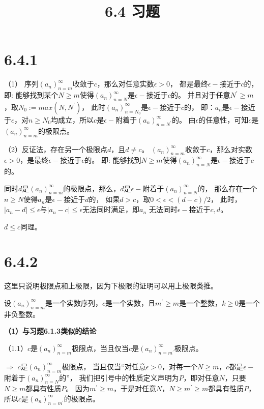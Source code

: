 \documentclass{article}
\theoremstyle{mystyle}
\begin{document}
\title{6.4 习题}
\maketitle

\section*{6.4.1}

（1）
序列$(a_n)_{n=m}^\infty$收敛于$c$，那么对任意实数$\epsilon > 0$，
都是最终$\epsilon -$接近于$c$的，
即: 能够找到某个$N \geq m$使得$(a_n)_{n=N}^\infty$是$\epsilon-$接近于$c$的。
并且对于任意$N^\prime \geq m$，取$N_0 := max(N, N^\prime)$，
此时$(a_n)_{n=N_0}^\infty$是$\epsilon-$接近于$c$的，
即：$a_n$是$\epsilon-$接近于$c$，对$n \geq N_0$均成立，所以$c$是$\epsilon-$附着于$(a_n)_{n=N^\prime}^\infty$的。
由$\epsilon$的任意性，可知$c$是$(a_n)_{n=m}^\infty$的极限点。

（2）反证法，存在另一个极限点$d$，且$d \neq c$。
$(a_n)_{n=m}^\infty$收敛于$c$，那么对实数$\epsilon > 0$，是最终$\epsilon -$接近于$c$的。
即: 能够找到$N \geq m$使得$(a_n)_{n=N}^\infty$是$\epsilon-$接近于$c$的。

同时$d$是$(a_n)_{n=m}^\infty$的极限点，那么，$d$是$\epsilon-$附着于$(a_n)_{n=N}^\infty$的，
那么存在一个$n \geq N$使得$a_n$是$\epsilon-$接近于$d$的，
如果$d > c$，取$0 <\epsilon < (d-c)/2$，
此时，$|a_n - d| \leq \epsilon$与$|a_n - c| \leq \epsilon$无法同时满足，即$a_n$
无法同时$\epsilon-$接近于$c,d$。

$d \leq c$同理。

\section*{6.4.2}

这里只说明极限点和上极限，因为下极限的证明可以用上极限类推。

设$(a_n)_{n=m}^\infty$是一个实数序列，$c$是一个实数，且$m^\prime \geq m$是一个整数，$k \geq 0$是一个非负整数。

\textbf{（1）与习题6.1.3类似的结论}

（1.1）$c$是$(a_n)_{n=m}^\infty$极限点，当且仅当$c$是$(a_n)_{n=m^\prime}^\infty$极限点。

\textbf{$\Rightarrow$} $c$是$(a_n)_{n=m}^\infty$极限点，
当且仅当“对任意$\epsilon > 0$，对每一个$N \geq m$，$c$都是$\epsilon-$附着于$(a_n)_{n=N}^\infty$的”，
我们把引号中的性质定义声明为$P$，即对任意$N$，只要$N \geq m$都具有性质$P$。
因为$m^\prime \geq m$，于是对任意$N$，$N \geq m^\prime \geq m$都具有性质$P$，
所以$c$是$(a_n)_{n=m^\prime}^\infty$的极限点。
\end{document}
